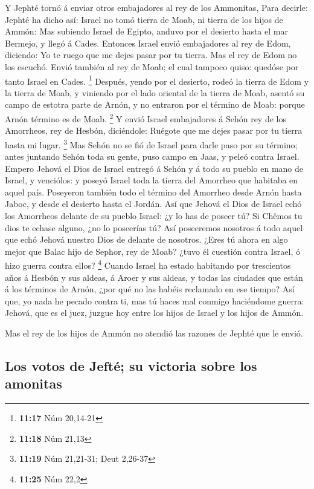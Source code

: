  Y Jephté tornó á enviar otros embajadores al rey de los
Ammonitas,  Para decirle: Jephté ha dicho así: Israel no
tomó tierra de Moab, ni tierra de los hijos de Ammón:  Mas
subiendo Israel de Egipto, anduvo por el desierto hasta el mar Bermejo,
y llegó á Cades.  Entonces Israel envió embajadores al rey
de Edom, diciendo: Yo te ruego que me dejes pasar por tu tierra. Mas el
rey de Edom no los escuchó. Envió también al rey de Moab; el cual
tampoco quiso: quedóse por tanto Israel en Cades. \footnote{\textbf{11:17}
  Núm 20,14-21}  Después, yendo por el desierto, rodeó la
tierra de Edom y la tierra de Moab, y viniendo por el lado oriental de
la tierra de Moab, asentó su campo de estotra parte de Arnón, y no
entraron por el término de Moab: porque Arnón término es de Moab.
\footnote{\textbf{11:18} Núm 21,13}  Y envió Israel
embajadores á Sehón rey de los Amorrheos, rey de Hesbón, diciéndole:
Ruégote que me dejes pasar por tu tierra hasta mi lugar. \footnote{\textbf{11:19}
  Núm 21,21-31; Deut 2,26-37}  Mas Sehón no se fió de
Israel para darle paso por su término; antes juntando Sehón toda su
gente, puso campo en Jaas, y peleó contra Israel.  Empero
Jehová el Dios de Israel entregó á Sehón y á todo su pueblo en mano de
Israel, y venciólos: y poseyó Israel toda la tierra del Amorrheo que
habitaba en aquel país.  Poseyeron también todo el término
del Amorrheo desde Arnón hasta Jaboc, y desde el desierto hasta el
Jordán.  Así que Jehová el Dios de Israel echó los
Amorrheos delante de su pueblo Israel: ¿y lo has de poseer tú?
 Si Chêmos tu dios te echase alguno, ¿no lo poseerías tú?
Así poseeremos nosotros á todo aquel que echó Jehová nuestro Dios de
delante de nosotros.  ¿Eres tú ahora en algo mejor que
Balac hijo de Sephor, rey de Moab? ¿tuvo él cuestión contra Israel, ó
hizo guerra contra ellos? \footnote{\textbf{11:25} Núm 22,2}
 Cuando Israel ha estado habitando por trescientos años á
Hesbón y sus aldeas, á Aroer y sus aldeas, y todas las ciudades que
están á los términos de Arnón, ¿por qué no las habéis reclamado en ese
tiempo?  Así que, yo nada he pecado contra ti, mas tú haces
mal conmigo haciéndome guerra: Jehová, que es el juez, juzgue hoy entre
los hijos de Israel y los hijos de Ammón.

 Mas el rey de los hijos de Ammón no atendió las razones de
Jephté que le envió.

\hypertarget{los-votos-de-jeftuxe9-su-victoria-sobre-los-amonitas}{%
\subsection{Los votos de Jefté; su victoria sobre los
amonitas}\label{los-votos-de-jeftuxe9-su-victoria-sobre-los-amonitas}}

